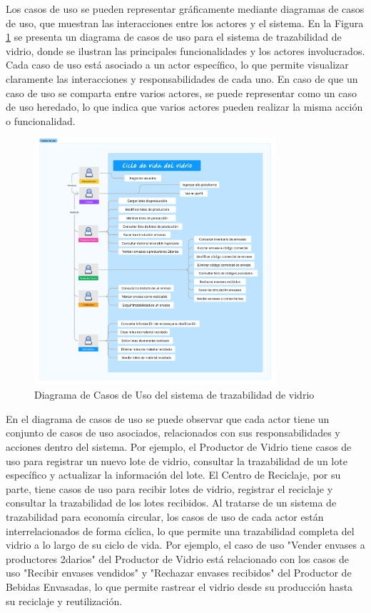 Los casos de uso se pueden representar gráficamente mediante diagramas de casos de uso, que muestran las interacciones entre los actores y el sistema. En la Figura \ref{fig:use-case-diagram} se presenta un diagrama de casos de uso para el sistema de trazabilidad de vidrio, donde se ilustran las principales funcionalidades y los actores involucrados. Cada caso de uso está asociado a un actor específico, lo que permite visualizar claramente las interacciones y responsabilidades de cada uno. En caso de que un caso de uso se comparta entre varios actores, se puede representar como un caso de uso heredado, lo que indica que varios actores pueden realizar la misma acción o funcionalidad. %

\begin{figure}[!htpb]
		\centering
		\includegraphics[width=0.8\textwidth]{Figures/use-case-diagram.png}
		\caption{Diagrama de Casos de Uso del sistema de trazabilidad de vidrio}
		\label{fig:use-case-diagram}
\end{figure}

En el diagrama de casos de uso se puede observar que cada actor tiene un conjunto de casos de uso asociados, relacionados con sus responsabilidades y acciones dentro del sistema. Por ejemplo, el Productor de Vidrio tiene casos de uso para registrar un nuevo lote de vidrio, consultar la trazabilidad de un lote específico y actualizar la información del lote. El Centro de Reciclaje, por su parte, tiene casos de uso para recibir lotes de vidrio, registrar el reciclaje y consultar la trazabilidad de los lotes recibidos. Al tratarse de un sistema de trazabilidad para economía circular, los casos de uso de cada actor están interrelacionados de forma cíclica, lo que permite una trazabilidad completa del vidrio a lo largo de su ciclo de vida. Por ejemplo, el caso de uso "Vender envases a productores 2darios" del Productor de Vidrio está relacionado con los casos de uso "Recibir envases vendidos" y "Rechazar envases recibidos" del Productor de Bebidas Envasadas, lo que permite rastrear el vidrio desde su producción hasta su reciclaje y reutilización.

